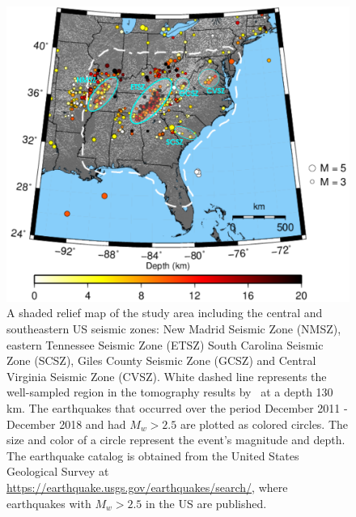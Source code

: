 \documentclass[draft,linenumbers]{agujournal2018}
\begin{document}
\begin{figure}[h!]
    \centering
    \includegraphics[width=32pc]{figures/seismicity_new.png}
    \caption{ A shaded relief map of the study area including the central and southeastern US seismic zones: New Madrid Seismic Zone (NMSZ), eastern Tennessee  Seismic Zone (ETSZ) South Carolina Seismic Zone (SCSZ), Giles County Seismic Zone (GCSZ) and Central Virginia Seismic Zone (CVSZ). White dashed line represents the well-sampled region in the tomography results by~\citet{Biryol_2016} at a depth 130 km. The earthquakes that occurred over the period December 2011 - December 2018 and had $M_{w} >2.5$ are plotted as colored circles. The size and color of a circle represent the event's magnitude and depth. The earthquake catalog is obtained from the United States Geological Survey at \url{https://earthquake.usgs.gov/earthquakes/search/}, where earthquakes with $M_{w}>2.5$ in the US are published.}
    \label{figone}
 \end{figure}
    
\end{document}
